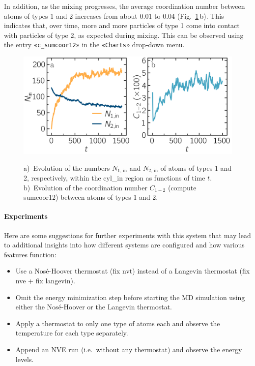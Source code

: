 \documentclass[9pt,tutorial]{livecoms}
\newcommand{\lmpcmd}[1]{\colorbox{listing}{\textcolor{command}{\small{#1}}}} %
\newcommand{\guicmd}[1]{\textcolor{command}{\texttt{«#1»}}} %
\begin{document}
In addition, as the mixing progresses, the average coordination number
between atoms of types 1 and 2 increases from about $0.01$ to $0.04$
(Fig.~\ref{fig:mixing}\,b).  This indicates that, over time, more and
more particles of type 1 come into contact with particles of type 2, as
expected during mixing.  This can be observed using the entry
\guicmd{c\_sumcoor12} in the \guicmd{Charts} drop-down menu.


\begin{figure}
\centering
\includegraphics[width=\linewidth]{LJ-mixing}\\[-2ex]
\caption{a)~Evolution of the numbers $N_\text{1, in}$ and $N_\text{2, in}$ of atoms
of types 1 and 2, respectively, within the \lmpcmd{cyl\_in} region as functions
of time $t$.  b)~Evolution of the coordination number $C_{1-2}$ (compute \lmpcmd{sumcoor12})
between atoms of types 1 and 2.}
\label{fig:mixing}
\end{figure}

\paragraph{Experiments}

Here are some suggestions for further experiments with this system that
may lead to additional insights into how different systems are configured
and how various features function:
\begin{itemize}
\item Use a Nos\'e-Hoover thermostat (\lmpcmd{fix nvt}) instead of a Langevin thermostat
  (\lmpcmd{fix nve} + \lmpcmd{fix langevin}).
\item Omit the energy minimization step before starting the MD simulation using either
the Nos\'e-Hoover or the Langevin thermostat.
\item Apply a thermostat to only one type of atoms each and observe the
  temperature for each type separately.
\item Append an NVE run (i.e.~without any thermostat) and observe the energy levels.
\end{itemize}
\end{document}
